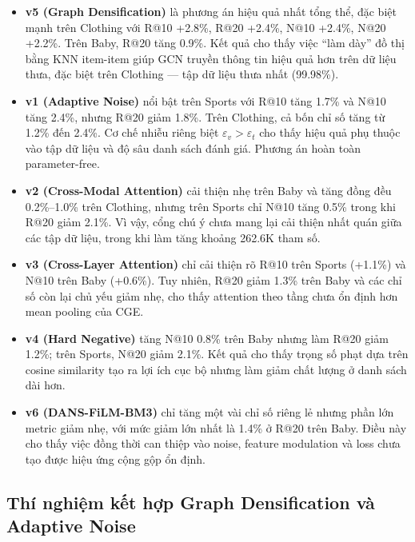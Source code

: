 \begin{itemize}[leftmargin=*,labelsep=6pt]
    \item \textbf{v5 (Graph Densification)} là phương án hiệu quả nhất tổng thể, đặc biệt mạnh trên Clothing với R@10 +2.8\%, R@20 +2.4\%, N@10 +2.4\%, N@20 +2.2\%. Trên Baby, R@20 tăng 0.9\%. Kết quả cho thấy việc ``làm dày'' đồ thị bằng KNN item-item giúp GCN truyền thông tin hiệu quả hơn trên dữ liệu thưa, đặc biệt trên Clothing --- tập dữ liệu thưa nhất (99.98\%).

    \item \textbf{v1 (Adaptive Noise)} nổi bật trên Sports với R@10 tăng 1.7\% và N@10 tăng 2.4\%, nhưng R@20 giảm 1.8\%. Trên Clothing, cả bốn chỉ số tăng từ 1.2\% đến 2.4\%. Cơ chế nhiễu riêng biệt $\varepsilon_v > \varepsilon_t$ cho thấy hiệu quả phụ thuộc vào tập dữ liệu và độ sâu danh sách đánh giá. Phương án hoàn toàn parameter-free.

    \item \textbf{v2 (Cross-Modal Attention)} cải thiện nhẹ trên Baby và tăng đồng đều 0.2\%--1.0\% trên Clothing, nhưng trên Sports chỉ N@10 tăng 0.5\% trong khi R@20 giảm 2.1\%. Vì vậy, cổng chú ý chưa mang lại cải thiện nhất quán giữa các tập dữ liệu, trong khi làm tăng khoảng 262.6K tham số.

    \item \textbf{v3 (Cross-Layer Attention)} chỉ cải thiện rõ R@10 trên Sports (+1.1\%) và N@10 trên Baby (+0.6\%). Tuy nhiên, R@20 giảm 1.3\% trên Baby và các chỉ số còn lại chủ yếu giảm nhẹ, cho thấy attention theo tầng chưa ổn định hơn mean pooling của CGE.

    \item \textbf{v4 (Hard Negative)} tăng N@10 0.8\% trên Baby nhưng làm R@20 giảm 1.2\%; trên Sports, N@20 giảm 2.1\%. Kết quả cho thấy trọng số phạt dựa trên cosine similarity tạo ra lợi ích cục bộ nhưng làm giảm chất lượng ở danh sách dài hơn.

    \item \textbf{v6 (DANS-FiLM-BM3)} chỉ tăng một vài chỉ số riêng lẻ nhưng phần lớn metric giảm nhẹ, với mức giảm lớn nhất là 1.4\% ở R@20 trên Baby. Điều này cho thấy việc đồng thời can thiệp vào noise, feature modulation và loss chưa tạo được hiệu ứng cộng gộp ổn định.
\end{itemize}


\subsection{Thí nghiệm kết hợp Graph Densification và Adaptive Noise}

